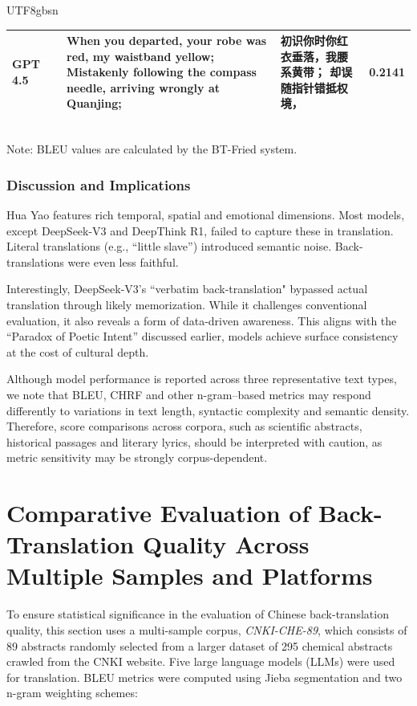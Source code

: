 \documentclass[conference]{IEEEtran}
\begin{document}
\begin{CJK}{UTF8}{gbsn}
\begin{table}[h]
\begin{tabular}{lp{4cm}p{4cm}p{4cm}l}
GPT 4.5 & & When you departed, your robe was red, my waistband yellow; Mistakenly following the compass needle, arriving wrongly at Quanjing; & 初识你时你红衣垂落，我腰系黄带； 却误随指针错抵权境， & 0.2141 \\
\bottomrule
\end{tabular}
\label{tab:hua_yao}
\\
\footnotesize{Note: BLEU values are calculated by the BT-Fried system.}
\end{table}

\subsubsection{Discussion and Implications}
Hua Yao features rich temporal, spatial and emotional dimensions. Most models, except DeepSeek-V3 and DeepThink R1, failed to capture these in translation. Literal translations (e.g., ``little slave'') introduced semantic noise. Back-translations were even less faithful.

Interestingly, DeepSeek-V3's ``verbatim back-translation" bypassed actual translation through likely memorization. While it challenges conventional evaluation, it also reveals a form of data-driven awareness. This aligns with the ``Paradox of Poetic Intent'' discussed earlier, models achieve surface consistency at the cost of cultural depth.

Although model performance is reported across three representative text types, we note that BLEU, CHRF and other n-gram–based metrics may respond differently to variations in text length, syntactic complexity and semantic density. Therefore, score comparisons across corpora, such as scientific abstracts, historical passages and literary lyrics, should be interpreted with caution, as metric sensitivity may be strongly corpus-dependent.




\section{Comparative Evaluation of Back-Translation Quality Across Multiple Samples and Platforms}
To ensure statistical significance in the evaluation of Chinese back-translation quality, this section uses a multi-sample corpus, \textit{CNKI-CHE-89}, which consists of 89 abstracts randomly selected from a larger dataset of 295 chemical abstracts crawled from the CNKI website. Five large language models (LLMs) were used for translation. BLEU metrics were computed using Jieba segmentation and two n-gram weighting schemes: 


\end{CJK}
\end{document}
